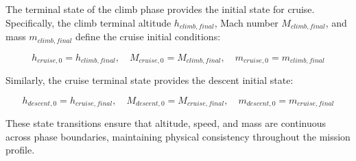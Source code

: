 The terminal state of the climb phase provides the initial state for cruise. Specifically, the climb terminal altitude $h_{climb,final}$, Mach number $M_{climb,final}$, and mass $m_{climb,final}$ define the cruise initial conditions:

\begin{equation}
h_{cruise,0} = h_{climb,final}, \quad M_{cruise,0} = M_{climb,final}, \quad m_{cruise,0} = m_{climb,final}
\end{equation}

Similarly, the cruise terminal state provides the descent initial state:

\begin{equation}
h_{descent,0} = h_{cruise,final}, \quad M_{descent,0} = M_{cruise,final}, \quad m_{descent,0} = m_{cruise,final}
\end{equation}

These state transitions ensure that altitude, speed, and mass are continuous across phase boundaries, maintaining physical consistency throughout the mission profile.

